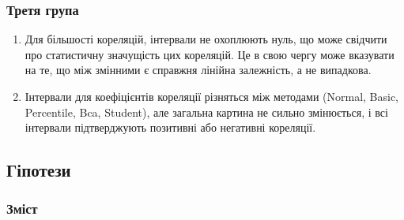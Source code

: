 \documentclass{beamer}
\begin{document}

\begin{frame}
  \frametitle{Третя група}

  \begin{enumerate}
    \item Для більшості кореляцій, інтервали не охоплюють нуль, що може свідчити про
    статистичну значущість цих кореляцій. Це в свою чергу може вказувати на те,
    що між змінними є справжня лінійна залежність, а не випадкова.
    \item Інтервали для коефіцієнтів кореляції різняться між методами 
    (Normal, Basic, Percentile, Bca, Student), але загальна картина не сильно 
    змінюється, і всі інтервали підтверджують позитивні або негативні кореляції. 
    
  
  \end{enumerate}
\end{frame}


\begin{frame}
  \section{Гіпотези}

  \frametitle{Зміст}
  \tableofcontents[currentsection]
\end{frame}
\end{document}
